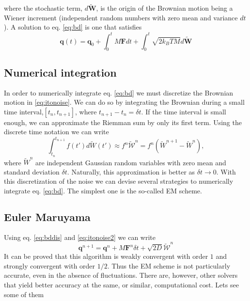 \documentclass[ twoside,openright,titlepage,numbers=noenddot,%
headinclude,footinclude,cleardoublepage=empty,abstract=on,
BCOR=5mm,paper=a4,fontsize=11pt, dvipsnames
]{scrreprt}
\renewcommand{\vec}[1]{\bm{#1}}
\newcommand{\dt}{\delta t}
\newcommand{\kT}{k_B T}
\newcommand{\noise}{\widetilde{W}}
\newcommand{\ppos}{q}
\begin{document}
where the stochastic term, $d\vec{\noise}$, is the origin of the Brownian motion being a Wiener increment (independent random numbers with zero mean and variance $dt$).
A solution to eq. \eqref{eq:bd} is one that satisfies
\begin{equation}
  \label{eq:bddis}
  \vec{\ppos}(t) = \vec{\ppos}_0 + \int_0^tM\vec{F}dt + \int_0^t\sqrt{2\kT M}d\vec{\noise}
\end{equation}

\subsection*{Numerical integration}
In order to numerically integrate eq. \eqref{eq:bd} we must discretize the Brownian motion in \eqref{eq:itonoise}. We can do so by integrating the Brownian during a small time interval,$[t_n, t_{n+1}]$, where $t_{n+1}-t_{n} = \dt$. If the time interval is small enough, we can approximate the Riemman sum by only its first term. Using the discrete time notation we can write
\begin{equation}
  \label{eq:itonoise2}
  \int_{t_n}^{t_{n+1}}f(t')d\noise(t') \approx f^n \mathcal{\noise}^n = f^n \left(\noise^{n+1} - \noise^n\right),
\end{equation}
where $\noise^n$ are independent Gaussian random variables with zero mean and standard deviation $\dt$. Naturally, this approximation is better as $\dt \rightarrow 0$.
With this discretization of the noise we can devise several strategies to numerically integrate eq. \eqref{eq:bd}. The simplest one is the so-called \gls{EM} scheme\cite{Desmond2001}.

\subsection*{Euler Maruyama}
Using eq. \eqref{eq:bddis} and \eqref{eq:itonoise2} we can write
\begin{equation}
  \label{eq:eulermaruyama}
  \vec{\ppos}^{n+1} = \vec{\ppos}^n + M\vec{F}^n\dt + \sqrt{2D}\vec{\mathcal{\noise}}^n
\end{equation}
It can be proved that this algorithm is weakly convergent with order $1$ and strongly convergent with order $1/2$\cite{Kloeden2011}. Thus the \gls{EM} scheme is not particularly accurate, even in the absence of fluctuations.
There are, however, other solvers that yield better accuracy at the same, or similar, computational cost. Lets see some of them
\end{document}
